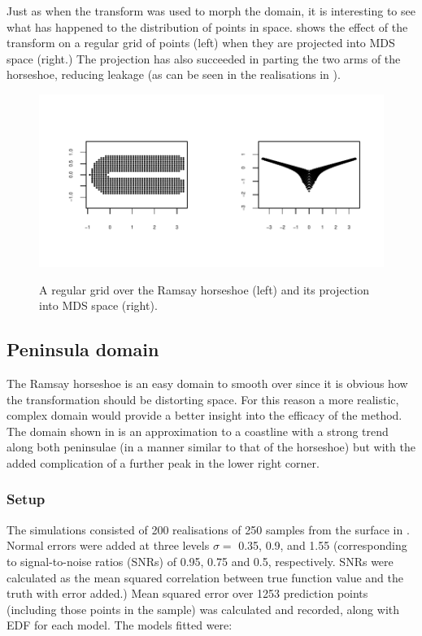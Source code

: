 Just as when the \sch transform was used to morph the domain, it is interesting to see what has happened to the distribution of points in space.  shows the effect of the transform on a regular grid of points (left) when they are projected into MDS space (right.) The projection has also succeeded in parting the two arms of the horseshoe, reducing leakage (as can be seen in the realisations in ).

\begin{figure}
\centering
\includegraphics[width=6in,trim=0.5in 0.5in 0in 0.5in]{mds/figs/mdsrampoints.pdf} \\
\caption{A regular grid over the Ramsay horseshoe (left) and its projection into MDS space (right).}
\label{mdsrampoints}
\end{figure}


\subsection{Peninsula domain}
\label{mds-wt2-sim}

The Ramsay horseshoe is an easy domain to smooth over since it is obvious how the transformation should be distorting space. For this reason a more realistic, complex domain would provide a better insight into the efficacy of the method. The domain shown in  is an approximation to a coastline with a strong trend along both peninsulae (in a manner similar to that of the horseshoe) but with the added complication of a further peak in the lower right corner.

\subsubsection{Setup}

The simulations consisted of 200 realisations of 250 samples from the surface in . Normal errors were added at three levels $\sigma=$ 0.35, 0.9, and 1.55 (corresponding to signal-to-noise ratios (SNRs) of 0.95, 0.75 and 0.5, respectively. SNRs were calculated as the mean squared correlation between true function value and the truth with error added.) Mean squared error over 1253 prediction points (including those points in the sample) was calculated and recorded, along with EDF for each model. The models fitted were:

